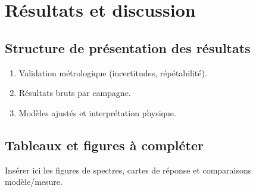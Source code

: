 \chapter{Résultats et discussion}

\section{Structure de présentation des résultats}
\begin{enumerate}
  \item Validation métrologique (incertitudes, répétabilité).
  \item Résultats bruts par campagne.
  \item Modèles ajustés et interprétation physique.
\end{enumerate}

\section{Tableaux et figures à compléter}
Insérer ici les figures de spectres, cartes de réponse et comparaisons modèle/mesure.
